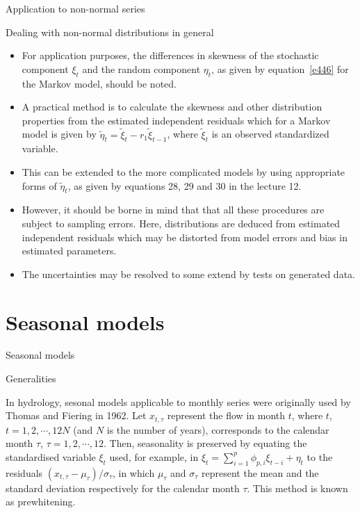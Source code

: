 \documentclass[8pt]{beamer}
\renewcommand{\emph}[1]{\textcolor{myorange}{#1}}
\begin{document}
\begin{frame}{Application to non-normal series}
    \begin{block}{Dealing with non-normal distributions in general}
    \end{block}
    \begin{itemize}
        \item For application purposes, the differences in \emph{skewness} of the \emph{stochastic component} $\xi_t$ and the \emph{random component} $\eta_t$, as given by equation~\ref{e446} for the \emph{Markov model}, should be noted.
        \item A practical method is to calculate the \emph{skewness} and other distribution properties from the estimated independent \emph{residuals} which for a \emph{Markov model} is given by $\tilde{\eta}_t = \tilde{\xi}_t - r_1 \tilde{\xi}_{t-1}$, where $\tilde{\xi}_t$ is an observed standardized variable. 
        \item This can be extended to the more complicated models by using appropriate forms of $\tilde{\eta}_t$, as given by equations 28, 29 and 30 in the lecture 12. 
        \item However, it should be borne in mind that that all these procedures are subject to \emph{sampling errors}. Here, \emph{distributions} are deduced from estimated independent \emph{residuals} which may be distorted from model \emph{errors} and \emph{bias} in estimated parameters. 
            \item The \emph{uncertainties} may be resolved to some extend by tests on generated data.
    \end{itemize}
\end{frame}

\section{Seasonal models}
\begin{frame}{Seasonal models}
    \begin{block}{Generalities}
    \end{block}
    In hydrology, sesonal models applicable to monthly series were originally used by Thomas and Fiering in 1962. Let $x_{t,\tau}$ represent the flow in month $t$, where $t$, $t = 1,2, \cdots, 12N$ (and $N$ is the number of years), corresponds to the calendar month $\tau$, $\tau =1,2, \cdots, 12$. Then, seasonality is preserved by equating the standardised variable $\xi_t$ used, for example, in $\xi_t = \sum_{i=1}^p \phi_{p,i} \xi_{t-i} + \eta_t$ to the residuals $(x_{t,\tau} -\mu_{\tau})/\sigma_{\tau}$, in which $\mu_{\tau}$ and $\sigma_{\tau}$ represent the \emph{mean} and the \emph{standard deviation} respectively for the calendar month $\tau$. This method is known as \alert{prewhitening}. 
\end{frame}
\end{document}
